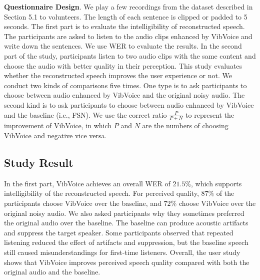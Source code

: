 \noindent\textbf{Questionnaire Design}.
We play a few recordings from the dataset described in Section 5.1 to volunteers. The length of each sentence is clipped or padded to 5 seconds.
The first part is to evaluate the intelligibility of reconstructed speech. The participants are asked to listen to the audio clips enhanced by VibVoice and write down the sentences. We use WER to evaluate the results.
In the second part of the study, participants listen to two audio clips with the same content and choose the audio with better quality in their perception. This study evaluates whether the reconstructed speech improves the user experience or not.
We conduct two kinds of comparisons five times. One type is to ask participants to choose between audio enhanced by VibVoice and the original noisy audio. The second kind is to ask participants to choose between audio enhanced by VibVoice and the baseline (i.e., FSN). We use the correct ratio $\frac{P}{P+N}$ to represent the improvement of VibVoice, in which $P$ and $N$ are the numbers of choosing VibVoice and negative vice versa.


\subsection{Study Result}
In the first part, VibVoice achieves an overall WER of $21.5\%$, which supports intelligibility of the reconstructed speech.
For perceived quality, $87\%$ of the participants choose VibVoice over the baseline, and $72\%$ choose VibVoice over the original noisy audio.
We also asked participants why they sometimes preferred the original audio over the baseline. The baseline can produce acoustic artifacts and suppress the target speaker. Some participants observed that repeated listening reduced the effect of artifacts and suppression, but the baseline speech still caused misunderstandings for first-time listeners. Overall, the user study shows that VibVoice improves perceived speech quality compared with both the original audio and the baseline.
